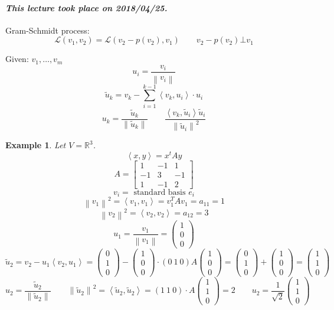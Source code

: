 \documentclass{article}
\newtheorem{example}{Example}  \numberwithin{example}{section}
\newcommand{\ip}[2]{\left\langle#1,#2\right\rangle} %
\newcommand{\norm}[1]{\left\|#1\right\|}
\newcommand{\dateref}[1]{\paragraph{\textit{This lecture took place on #1.}}}
\begin{document}
\dateref{2018/04/25}

Gram-Schmidt process:
\[ \mathcal L(v_1, v_2) = \mathcal L(v_2 - p(v_2), v_1) \qquad v_2 - p(v_2) \bot v_1 \]

Given: $v_1, \ldots, v_m$
\[ u_i = \frac{v_i}{\norm{v_i}} \]
\[ \tilde u_k = v_k - \sum_{i=1}^{k-1} \ip{v_k}{u_i} \cdot u_i \]
\[ u_k = \frac{\tilde u_k}{\norm{\tilde u_k}} \qquad \frac{\ip{v_k}{\tilde u_i} \tilde u_i}{\norm{\tilde u_i}^2} \]

\begin{example}
  Let $V = \mathbb R^3$.
  \[ \ip xy = x^t A y \]
  \[
    A = \begin{bmatrix}
      1 & -1 & 1 \\
      -1 & 3 & -1 \\
      1 & -1 & 2
    \end{bmatrix}
  \]
  \[ v_i = \text{ standard basis } e_i \]
  \[ \norm{v_1}^2 = \ip{v_1}{v_1} = v_1^T A v_1 = a_{11} = 1 \]
  \[ \norm{v_2}^2 = \ip{v_2}{v_2} = a_{12} = 3 \]
  \[ u_1 = \frac{v_1}{\norm{v_1}} = \begin{pmatrix} 1 \\ 0 \\ 0 \end{pmatrix} \]
  \[ \tilde u_2 = v_2 - u_1 \ip{v_2}{u_1} = \begin{pmatrix} 0 \\ 1 \\ 0 \end{pmatrix} - \begin{pmatrix} 1 \\ 0 \\ 0 \end{pmatrix} \cdot (0 \: 1 \: 0) A \begin{pmatrix} 1 \\ 0 \\ 0 \end{pmatrix} = \begin{pmatrix} 0 \\ 1 \\ 0 \end{pmatrix} + \begin{pmatrix} 1 \\ 0 \\ 0 \end{pmatrix} = \begin{pmatrix} 1 \\ 1 \\ 0 \end{pmatrix} \]
  \[ u_2 = \frac{\tilde u_2}{\norm{\tilde u_2}} \qquad \norm{\tilde u_2}^2 = \ip{\tilde u_2}{\tilde u_2} = (1 \: 1 \: 0) \cdot A \begin{pmatrix} 1 \\ 1 \\ 0 \end{pmatrix} = 2 \qquad u_2 = \frac{1}{\sqrt2} \begin{pmatrix} 1 \\ 1 \\ 0 \end{pmatrix} \]

\end{example}
\end{document}
